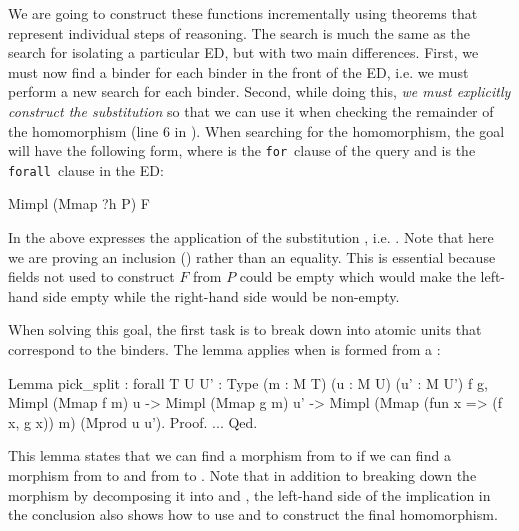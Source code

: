 \documentclass{sigplanconf}
\newcommand{\FOR}{{\tt for}\relax\ifmmode\ \else\xspace\fi}
\newcommand{\FORALL}{{\tt forall}\relax\ifmmode\ \else\xspace\fi}
\begin{document}
We are going to construct these functions incrementally using theorems that represent individual steps of reasoning.
The search is much the same as the search for isolating a particular ED, but with two main differences.
First, we must now find a binder for each binder in the front of the ED, i.e. we must perform a new search for each binder.
Second, while doing this, \emph{we must explicitly construct the substitution } so that we can use it when checking the remainder of the homomorphism (line 6 in ).
When searching for the homomorphism, the goal will have the following form, where  is the \FOR clause of the query and  is the \FORALL clause in the ED:
\begin{coq}
Mimpl (Mmap ?h P) F
\end{coq}
In the above %
 expresses the application of the substitution , i.e. .
Note that here we are proving an inclusion () rather than an equality.
This is essential because fields not used to construct $F$ from $P$ could be empty which would make the left-hand side empty while the right-hand side would be non-empty.

When solving this goal, the first task is to break  down into atomic units that correspond to the binders.
The  lemma applies when  is formed from a :
\begin{coq}
Lemma pick_split
: forall {T U U' : Type} (m : M T) (u : M U) (u' : M U') f g,
  Mimpl (Mmap f m) u ->
  Mimpl (Mmap g m) u' ->
  Mimpl (Mmap (fun x => (f x, g x)) m) (Mprod u u').
Proof. ... Qed.
\end{coq}
This lemma states that we can find a morphism from  to  if we can find a morphism from  to  and from  to .
Note that in addition to breaking down the morphism by decomposing it into  and , the left-hand side of the implication in the conclusion also shows how to use  and  to construct the final homomorphism.
\end{document}

